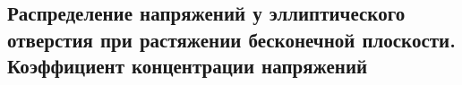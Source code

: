 

\subsection{Распределение напряжений у эллиптического отверстия при растяжении бесконечной плоскости. Коэффициент концентрации напряжений}




